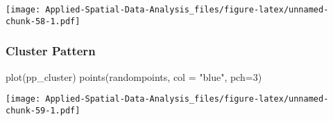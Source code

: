 \documentclass[
]{book}
\newenvironment{Shaded}{\begin{snugshade}}{\end{snugshade}}
\newcommand{\AttributeTok}[1]{\textcolor[rgb]{0.77,0.63,0.00}{#1}}
\newcommand{\DecValTok}[1]{\textcolor[rgb]{0.00,0.00,0.81}{#1}}
\newcommand{\FunctionTok}[1]{\textcolor[rgb]{0.00,0.00,0.00}{#1}}
\newcommand{\NormalTok}[1]{#1}
\newcommand{\StringTok}[1]{\textcolor[rgb]{0.31,0.60,0.02}{#1}}
\begin{document}
\texttt{[image: Applied-Spatial-Data-Analysis\_files/figure-latex/unnamed-chunk-58-1.pdf]}

\hypertarget{cluster-pattern-1}{%
\subsubsection{Cluster Pattern}\label{cluster-pattern-1}}

\begin{Shaded}
\begin{Highlighting}[]
\FunctionTok{plot}\NormalTok{(pp\_cluster)}
\FunctionTok{points}\NormalTok{(randompoints, }\AttributeTok{col =} \StringTok{"blue"}\NormalTok{, }\AttributeTok{pch=}\DecValTok{3}\NormalTok{)}
\end{Highlighting}
\end{Shaded}

\texttt{[image: Applied-Spatial-Data-Analysis\_files/figure-latex/unnamed-chunk-59-1.pdf]}
\end{document}
